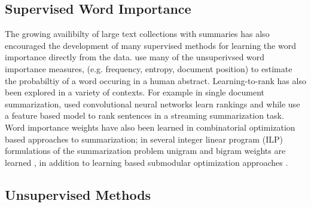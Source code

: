 \subsection{Supervised Word Importance}

The growing availibilty of large text collections with summaries has also
encouraged the development of many supervised methods for learning the word 
importance 
directly from the data. \cite{Regsum} use many of the unsuperivsed word  
importance measures, (e.g. frequency, entropy, document position) to estimate
the probabiltiy of a word occuring in a human abstract. Learning-to-rank
has also been explored in a variety of contexts. For example in single
document summarization, \cite{lapata} used convolutional neural networks
learn rankings and while \cite{guo,macreadie} use a feature based model
to rank sentences in a streaming summarization task.
Word importance weights have also been learned in combinatorial optimization
based approaches to summarization; in several integer linear program (ILP)
formulations of the summarization problem unigram and bigram weights 
are learned \cite{gillick,martens,berkely}, in addition to learning based
submodular optimization approaches \cite{submod,svm}.




\subsection{Unsupervised Methods}



 

